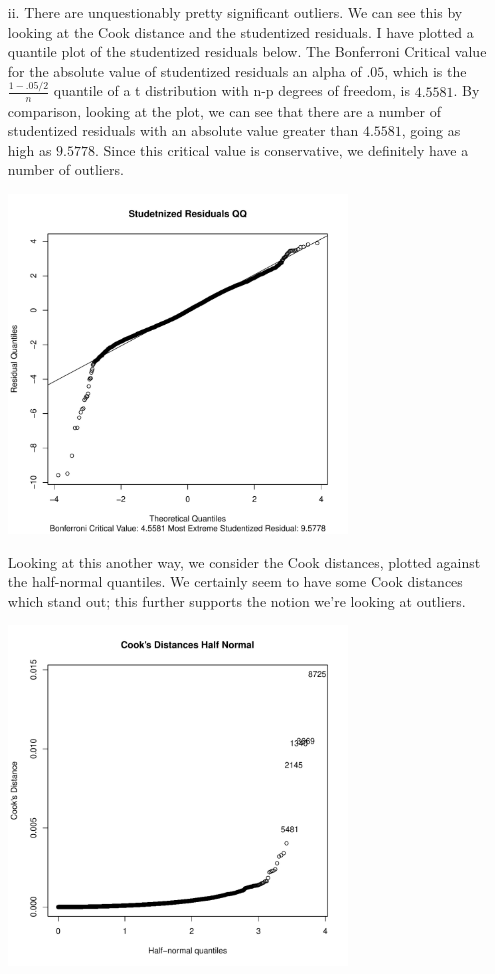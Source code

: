\documentclass[11pt]{article}
\theoremstyle{definition}
\begin{document}
\begin{itemize}
\begin{itemize}
\begin{itemize}
                    \item[ii.]
                        There are unquestionably pretty significant outliers. We can see this by looking at the Cook distance and the studentized residuals. I have plotted a quantile plot of the studentized residuals below. The Bonferroni Critical value for the absolute value of studentized residuals an alpha of $.05$, which is the \(\frac{1-.05/2}{n}\) quantile of a t distribution with n-p degrees of freedom, is $4.5581$. By comparison, looking at the plot, we can see that there are a number of studentized residuals with an absolute value greater than $4.5581$, going as high as $9.5778$. Since this critical value is conservative, we definitely have a number of outliers.
                        \begin{center}
                            \includegraphics[width=9cm]{final/2aii_stud_qq} 
                        \end{center}
                        Looking at this another way, we consider the Cook distances, plotted against the half-normal quantiles. We certainly seem to have some Cook distances which stand out; this further supports the notion we're looking at outliers.
                        \begin{center}
                            \includegraphics[width=9cm]{final/2aii_cook} 

\end{center}
\end{itemize}
\end{itemize}
\end{itemize}
\end{document}
